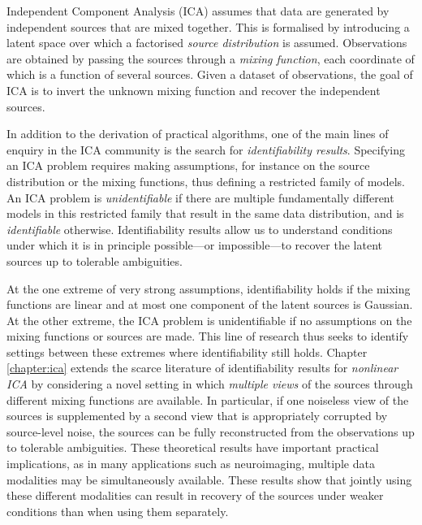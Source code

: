 Independent Component Analysis (ICA) assumes that data are generated by independent sources that are mixed together. 
This is formalised by introducing a latent space over which a factorised \emph{source distribution} is assumed. 
Observations are obtained by passing the sources through a \emph{mixing function}, each coordinate of which is a function of several sources.
Given a dataset of observations, the goal of ICA is to invert the unknown mixing function and recover the independent sources.

In addition to the derivation of practical algorithms, one of the main lines of enquiry in the ICA community is the search for \emph{identifiability results}.
Specifying an ICA problem requires making assumptions, for instance on the source distribution or the mixing functions, thus defining a restricted family of models.
An ICA problem is \emph{unidentifiable} if there are multiple fundamentally different models in this restricted family that result in the same data distribution, and is \emph{identifiable} otherwise.
Identifiability results allow us to understand conditions under which it is in principle possible---or impossible---to recover the latent sources up to tolerable ambiguities.


At the one extreme of very strong assumptions, identifiability holds if the mixing functions are linear and at most one component of the latent sources is Gaussian. 
At the other extreme, the ICA problem is unidentifiable if no assumptions on the mixing functions or sources are made. 
This line of research thus seeks to identify settings between these extremes where identifiability still holds. 
Chapter \ref{chapter:ica} extends the scarce literature of identifiability results for \emph{nonlinear ICA} by considering a novel setting in which \emph{multiple views} of the sources through different mixing functions are available.
In particular, if one noiseless view of the sources is supplemented by a second view that is appropriately corrupted by source-level noise, the sources can be fully reconstructed from the observations up to tolerable ambiguities.
These theoretical results have important practical implications, as in many applications such as neuroimaging, multiple data modalities may be simultaneously available.
These results show that jointly using these different modalities can result in recovery of the sources under weaker conditions than when using them separately.

